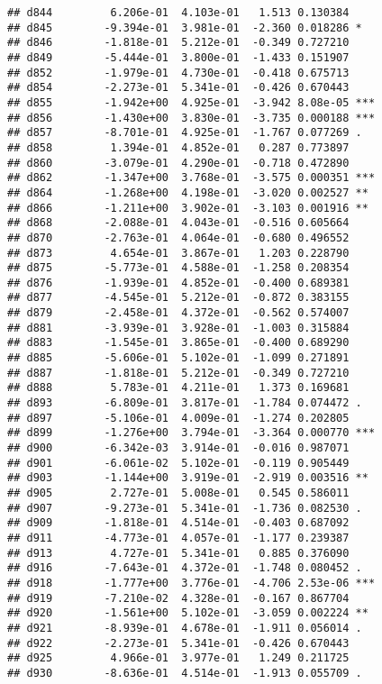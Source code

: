\documentclass[
]{article}
\begin{document}
\begin{verbatim}
## d844         6.206e-01  4.103e-01   1.513 0.130384    
## d845        -9.394e-01  3.981e-01  -2.360 0.018286 *  
## d846        -1.818e-01  5.212e-01  -0.349 0.727210    
## d849        -5.444e-01  3.800e-01  -1.433 0.151907    
## d852        -1.979e-01  4.730e-01  -0.418 0.675713    
## d854        -2.273e-01  5.341e-01  -0.426 0.670443    
## d855        -1.942e+00  4.925e-01  -3.942 8.08e-05 ***
## d856        -1.430e+00  3.830e-01  -3.735 0.000188 ***
## d857        -8.701e-01  4.925e-01  -1.767 0.077269 .  
## d858         1.394e-01  4.852e-01   0.287 0.773897    
## d860        -3.079e-01  4.290e-01  -0.718 0.472890    
## d862        -1.347e+00  3.768e-01  -3.575 0.000351 ***
## d864        -1.268e+00  4.198e-01  -3.020 0.002527 ** 
## d866        -1.211e+00  3.902e-01  -3.103 0.001916 ** 
## d868        -2.088e-01  4.043e-01  -0.516 0.605664    
## d870        -2.763e-01  4.064e-01  -0.680 0.496552    
## d873         4.654e-01  3.867e-01   1.203 0.228790    
## d875        -5.773e-01  4.588e-01  -1.258 0.208354    
## d876        -1.939e-01  4.852e-01  -0.400 0.689381    
## d877        -4.545e-01  5.212e-01  -0.872 0.383155    
## d879        -2.458e-01  4.372e-01  -0.562 0.574007    
## d881        -3.939e-01  3.928e-01  -1.003 0.315884    
## d883        -1.545e-01  3.865e-01  -0.400 0.689290    
## d885        -5.606e-01  5.102e-01  -1.099 0.271891    
## d887        -1.818e-01  5.212e-01  -0.349 0.727210    
## d888         5.783e-01  4.211e-01   1.373 0.169681    
## d893        -6.809e-01  3.817e-01  -1.784 0.074472 .  
## d897        -5.106e-01  4.009e-01  -1.274 0.202805    
## d899        -1.276e+00  3.794e-01  -3.364 0.000770 ***
## d900        -6.342e-03  3.914e-01  -0.016 0.987071    
## d901        -6.061e-02  5.102e-01  -0.119 0.905449    
## d903        -1.144e+00  3.919e-01  -2.919 0.003516 ** 
## d905         2.727e-01  5.008e-01   0.545 0.586011    
## d907        -9.273e-01  5.341e-01  -1.736 0.082530 .  
## d909        -1.818e-01  4.514e-01  -0.403 0.687092    
## d911        -4.773e-01  4.057e-01  -1.177 0.239387    
## d913         4.727e-01  5.341e-01   0.885 0.376090    
## d916        -7.643e-01  4.372e-01  -1.748 0.080452 .  
## d918        -1.777e+00  3.776e-01  -4.706 2.53e-06 ***
## d919        -7.210e-02  4.328e-01  -0.167 0.867704    
## d920        -1.561e+00  5.102e-01  -3.059 0.002224 ** 
## d921        -8.939e-01  4.678e-01  -1.911 0.056014 .  
## d922        -2.273e-01  5.341e-01  -0.426 0.670443    
## d925         4.966e-01  3.977e-01   1.249 0.211725    
## d930        -8.636e-01  4.514e-01  -1.913 0.055709 .  

\end{verbatim}
\end{document}
